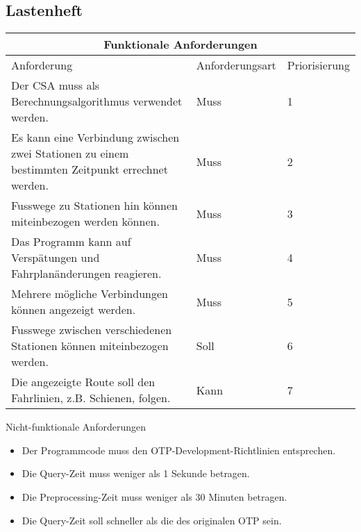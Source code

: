 \subsection{Lastenheft}
\label{Lastenheft}
\begin{tabular}{ | p{5cm} | l | l | }
	\hline
	\multicolumn{3}{|c|}{Funktionale Anforderungen} \\
	\hline
	Anforderung & Anforderungsart & Priorisierung \\
	\hline
	Der CSA muss als Berechnungsalgorithmus verwendet werden. & Muss & 1 \\
	\hline
	Es kann eine Verbindung zwischen zwei Stationen zu einem bestimmten Zeitpunkt errechnet werden. & Muss & 2 \\
	\hline
	Fusswege zu Stationen hin können miteinbezogen werden können. & Muss & 3 \\
	\hline
	Das Programm kann auf Verspätungen und Fahrplanänderungen reagieren. & Muss & 4 \\
	\hline
	Mehrere mögliche Verbindungen können angezeigt werden. & Muss & 5 \\
	\hline
	Fusswege zwischen verschiedenen Stationen können miteinbezogen werden. & Soll & 6 \\
	\hline
	Die angezeigte Route soll den Fahrlinien, z.B. Schienen, folgen. & Kann & 7 \\
	\hline
\end{tabular}
\newline
\newline
\newline
Nicht-funktionale Anforderungen
\begin{itemize}
	\item Der Programmcode muss den OTP-Development-Richtlinien entsprechen.
	\item Die Query-Zeit muss weniger als 1 Sekunde betragen.
	\item Die Preprocessing-Zeit muss weniger als 30 Minuten betragen.
	\item Die Query-Zeit soll schneller als die des originalen OTP sein.
\end{itemize}